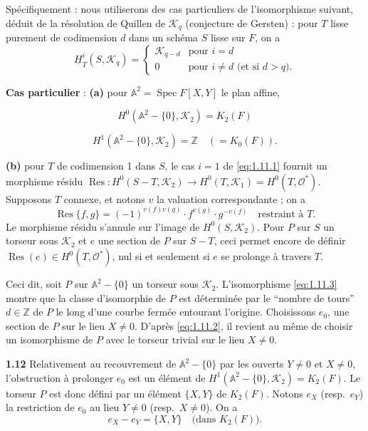 \documentclass[12pt,a4paper]{article}
\theoremstyle{plain}
\theoremstyle{definition}
\theoremstyle{remark}
\DeclareMathOperator{\Res}{Res}
\newcommand{\ZZ}{\mathbb{Z}}
\newcommand{\cO}{\mathcal{O}}
\newcommand{\cK}{\mathcal{K}}
\providecommand{\AA}{\mathbb{A}}
\providecommand{\ZZ}{\mathbb{Z}}
\providecommand{\cK}{\mathcal{K}}
\providecommand{\cO}{\mathcal{O}}
\providecommand{\Spec}{\operatorname{Spec}}
\begin{document}
Spécifiquement : nous utiliserons des cas particuliers de l'isomorphisme suivant, déduit de la résolution de Quillen de $\cK_q$ (conjecture de Gersten) : pour $T$ lisse purement de codimension $d$ dans un schéma $S$ lisse sur $F$, on a
\begin{equation}\label{eq:1.11.1}
\underline{H}_T^i(S, \cK_q) = \begin{cases} \cK_{q-d} & \text{pour } i = d \\ 0 & \text{pour } i \neq d \text{ (et si } d > q\text{).} \end{cases}
\tag{1.11.1}
\end{equation}

\textbf{Cas particulier} : \textbf{(a)} pour $\AA^2 = \Spec F[X, Y]$ le plan affine,

\begin{equation}\label{eq:1.11.2}
H^0(\AA^2 - \{0\}, \cK_2) = K_2(F)
\tag{1.11.2}
\end{equation}

\begin{equation}\label{eq:1.11.3}
H^1(\AA^2 - \{0\}, \cK_2) = \ZZ \quad (= K_0(F)).
\tag{1.11.3}
\end{equation}

\textbf{(b)} pour $T$ de codimension 1 dans $S$, le cas $i = 1$ de \eqref{eq:1.11.1} fournit un morphisme résidu $\Res : H^0(S - T, \cK_2) \to H^0(T, \cK_1) = H^0(T, \cO^*)$. Supposons $T$ connexe, et notons $v$ la valuation correspondante ; on a
\[
\Res\{f, g\} = (-1)^{v(f)v(g)} \cdot f^{v(g)} \cdot g^{-v(f)} \quad \text{restraint à } T.
\]
Le morphisme résidu s'annule sur l'image de $H^0(S, \cK_2)$. Pour $P$ sur $S$ un torseur sous $\cK_2$ et $e$ une section de $P$ sur $S - T$, ceci permet encore de définir $\Res(e) \in H^0(T, \cO^*)$, nul si et seulement si $e$ se prolonge à travers $T$.

Ceci dit, soit $P$ sur $\AA^2 - \{0\}$ un torseur sous $\cK_2$. L'isomorphisme \eqref{eq:1.11.3} montre que la classe d'isomorphie de $P$ est déterminée par le ``nombre de tours'' $d \in \ZZ$ de $P$ le long d'une courbe fermée entourant l'origine. Choisissons $e_0$, une section de $P$ sur le lieu $X \neq 0$. D'après \eqref{eq:1.11.2}, il revient au même de choisir un isomorphisme de $P$ avec le torseur trivial sur le lieu $X \neq 0$.

\textbf{1.12} Relativement au recouvrement de $\AA^2 - \{0\}$ par les ouverts $Y \neq 0$ et $X \neq 0$, l'obstruction à prolonger $e_0$ est un élément de $H^1(\AA^2 - \{0\}, \cK_2) = K_2(F)$. Le torseur $P$ est donc défini par un élément $\{X, Y\}$ de $K_2(F)$. Notons $e_X$ (resp.\ $e_Y$) la restriction de $e_0$ au lieu $Y \neq 0$ (resp.\ $X \neq 0$). On a
\[
e_X - e_Y = \{X, Y\} \quad \text{(dans } K_2(F)\text{).}
\]
\end{document}
